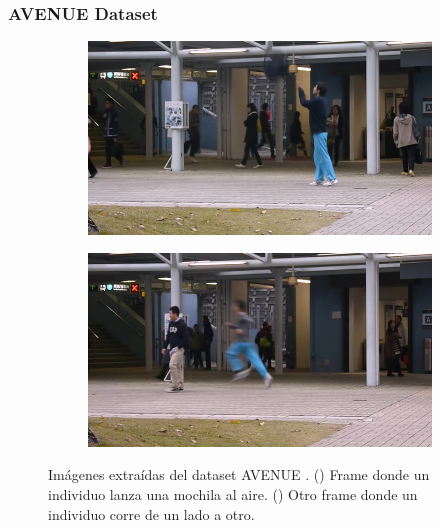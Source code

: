 \subsubsection{AVENUE Dataset}

\begin{figure}[ht]
  \centering
  \begin{subfigure}[b]{0.4\textwidth}
    \includegraphics[width=\textwidth]{img/chapters/resultados/bases-datos/avenue_1.jpg}
    \caption{}
    \label{fig:avenue_1}
  \end{subfigure}
  \qquad\qquad
  \begin{subfigure}[b]{0.4\textwidth}
    \includegraphics[width=\textwidth]{img/chapters/resultados/bases-datos/avenue_2.jpg}
    \caption{}
    \label{fig:avenue_2}
  \end{subfigure}
  \caption{Imágenes extraídas del dataset AVENUE \cite{avenue-dataset}.
    (\protect{}) Frame donde un individuo lanza una mochila al aire.
    (\protect{}) Otro frame donde un individuo corre de un lado a otro.}
  \label{fig:avenue}
\end{figure}


